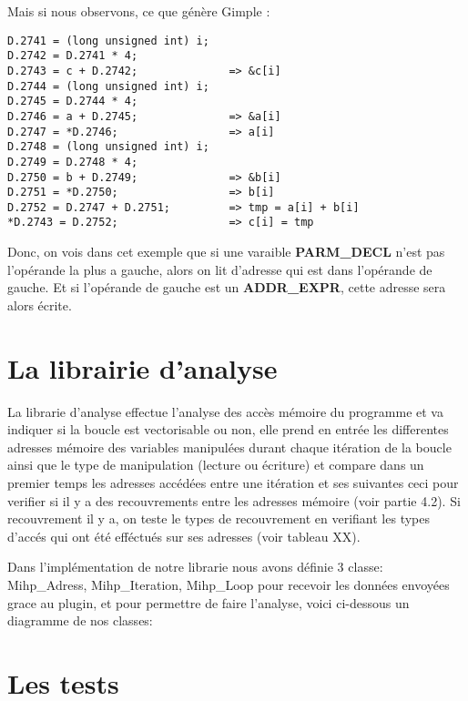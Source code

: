 \documentclass[12pt,french]{article}
\begin{document}
Mais si nous observons, ce que génère Gimple :

\begin{center}
\color{blue}
\begin{lstlisting}
D.2741 = (long unsigned int) i;
D.2742 = D.2741 * 4;
D.2743 = c + D.2742;              => &c[i]
D.2744 = (long unsigned int) i;
D.2745 = D.2744 * 4;
D.2746 = a + D.2745;              => &a[i]
D.2747 = *D.2746;                 => a[i]
D.2748 = (long unsigned int) i;
D.2749 = D.2748 * 4;
D.2750 = b + D.2749;              => &b[i]
D.2751 = *D.2750;                 => b[i]
D.2752 = D.2747 + D.2751;         => tmp = a[i] + b[i]
*D.2743 = D.2752;                 => c[i] = tmp
\end{lstlisting}
\end{center}

Donc, on vois dans cet exemple que si une varaible \textbf{PARM\_DECL} n'est pas l'opérande la plus a gauche, alors on lit d'adresse qui est dans l'opérande de gauche. Et si l'opérande de gauche est un \textbf{ADDR\_EXPR}, cette adresse sera alors écrite.


\section{\color{blue}La librairie d'analyse}

La librarie d'analyse effectue l'analyse des accès mémoire du programme et va indiquer si la boucle est vectorisable ou non, elle prend en entrée les differentes adresses mémoire des variables manipulées durant chaque itération de la boucle ainsi que le type de manipulation (lecture ou écriture) et compare dans un premier temps les adresses accédées entre une itération et ses suivantes ceci pour verifier si il y a des recouvrements entre les adresses mémoire (voir partie 4.2). Si recouvrement il y a, on teste le types de recouvrement en verifiant les types d'accés qui ont été efféctués sur ses adresses (voir tableau XX).

Dans l'implémentation de notre librarie nous avons définie 3 classe: Mihp\_Adress, Mihp\_Iteration, Mihp\_Loop pour recevoir les données envoyées grace au plugin, et pour permettre de faire l'analyse, voici ci-dessous un diagramme de nos classes: 	

\section{\color{blue}Les tests}
\end{document}
